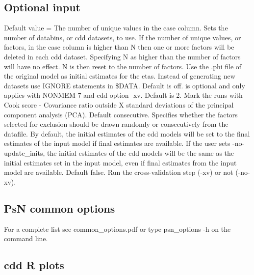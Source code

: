\subsection {Optional input}
\begin{optionlist}
Default value = The number of unique values in the case column. Sets the number of databins, or cdd datasets, to use. If the number of unique values, or factors, in the case column is higher than N then one or more factors will be deleted in each cdd dataset. Specifying N as higher than the number of factors will have no effect. N is then reset to the number of factors. 
\nextopt
{}
Use the .phi file of the original model as initial estimates for the etas.
\nextopt
{}
Instead of generating new datasets use IGNORE statements in \$DATA. Default is off.
\nextopt
{}
is optional and only applies with NONMEM 7 and cdd option -xv. 
Default is 2. Mark the runs with Cook score - Covariance ratio outside X standard deviations of the principal component analysis (PCA). 
\nextopt
{}
Default consecutive. Specifies whether the factors selected for exclusion should be drawn randomly or consecutively from the datafile. 
\nextopt
{}
By default, the initial estimates of the cdd models will be set to the final estimates of the input model if final
estimates are available. If the user sets -no-update\_inits, the initial estimates of the cdd models will be
the same as the initial estimates set in the input model, even if final estimates from the input model are available.
\nextopt
{}
Default false. Run the cross-validation step (-xv) or not (-no-xv). 
\nextopt
\end{optionlist}
			
\subsection{PsN common options}
For a complete list see common\_options.pdf or type psn\_options -h on the command line.
		
\subsection{cdd R plots}
\newcommand{\rplotsconditions}{
If option -rplots is set $>=1$, a plot with Covariance ratios
vs Cook scores for each case, e.g. ID, will be generated. 
The default cdd R plots template 
requires no special R libraries.
If no pdf is generated,
see the .Rout file in the main run directory for error messages.}



